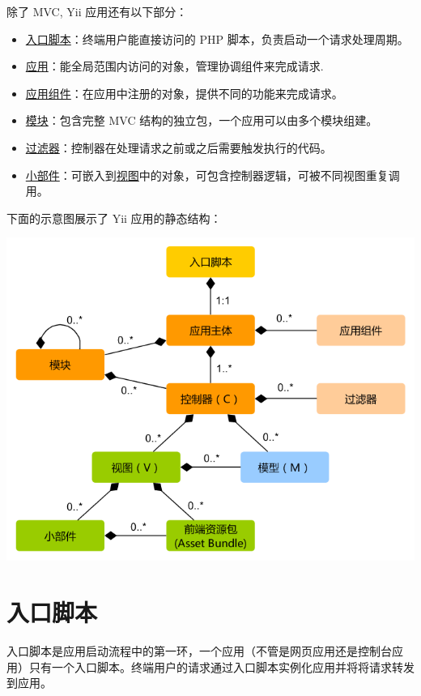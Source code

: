 除了 MVC, Yii 应用还有以下部分：

\begin{itemize}
\item \hyperref[structure-entry-scripts.md]{入口脚本}：终端用户能直接访问的 PHP 脚本，负责启动一个请求处理周期。
\item \hyperref[structure-applications.md]{应用}：能全局范围内访问的对象，管理协调组件来完成请求.
\item \hyperref[structure-application-components.md]{应用组件}：在应用中注册的对象，提供不同的功能来完成请求。
\item \hyperref[structure-modules.md]{模块}：包含完整 MVC 结构的独立包，一个应用可以由多个模块组建。 
\item \hyperref[structure-filters.md]{过滤器}：控制器在处理请求之前或之后需要触发执行的代码。
\item \hyperref[structure-widgets.md]{小部件}：可嵌入到\hyperref[structure-views.md]{视图}中的对象，可包含控制器逻辑，可被不同视图重复调用。
\end{itemize}
下面的示意图展示了 Yii 应用的静态结构：

\noindent\includegraphics[width=\textwidth]{images/application-structure.png}



\label{structure-entry-scripts.md}\section{入口脚本}
入口脚本是应用启动流程中的第一环，一个应用（不管是网页应用还是控制台应用）只有一个入口脚本。终端用户的请求通过入口脚本实例化应用并将将请求转发到应用。

